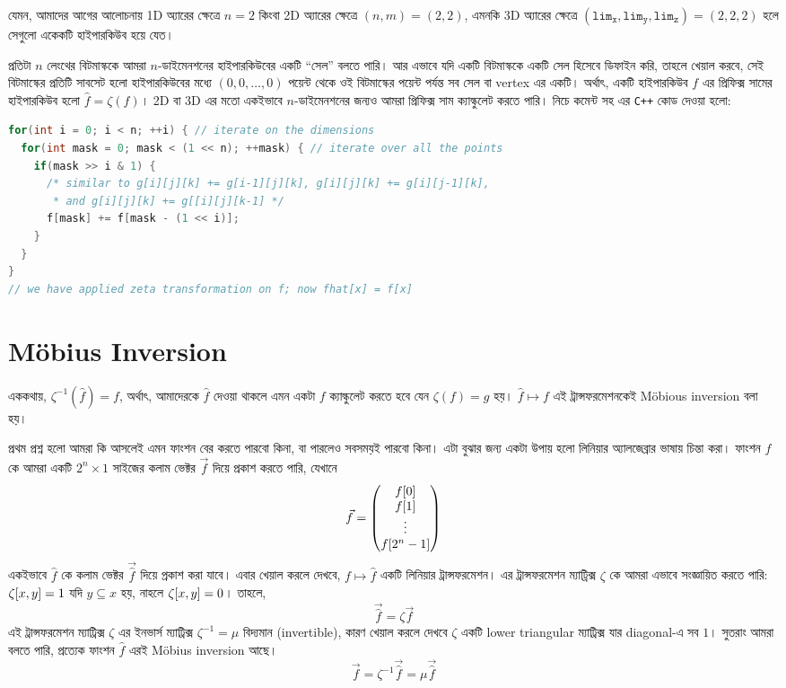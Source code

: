 যেমন, আমাদের আগের আলোচনায় 1D অ্যারের ক্ষেত্রে $n=2$ কিংবা 2D অ্যারের ক্ষেত্রে
$(n,m) = (2,2)$, এমনকি 3D অ্যারের ক্ষেত্রে $(\mathtt{lim_x}, \mathtt{lim_y},
\mathtt{lim_z}) = (2,2,2)$ হলে সেগুলো একেকটি হাইপারকিউব হয়ে যেত।

প্রতিটা $n$ লেংথের বিটমাস্ককে আমরা $n$-ডাইমেনশনের হাইপারকিউবের একটি ``সেল''
বলতে পারি। আর এভাবে যদি একটি বিটমাস্ককে একটি সেল হিসেবে ডিফাইন করি, তাহলে
খেয়াল করবে, সেই বিটমাস্কের প্রতিটি সাবসেট হলো হাইপারকিউবের মধ্যে $(0, 0,
\ldots, 0)$ পয়েন্ট থেকে ওই বিটমাস্কের পয়েন্ট পর্যন্ত সব সেল বা vertex এর
একটি। অর্থাৎ, একটি হাইপারকিউব $f$ এর প্রিফিক্স সামের হাইপারকিউব হলো $\hat{f}
= \zeta(f)$। 2D বা 3D এর মতো একইভাবে $n$-ডাইমেনশনের জন্যও আমরা প্রিফিক্স সাম
ক্যাল্কুলেট করতে পারি। নিচে কমেন্ট সহ এর \texttt{C++} কোড দেওয়া হলো:
\begin{lstlisting}[language=C++]
for(int i = 0; i < n; ++i) { // iterate on the dimensions
  for(int mask = 0; mask < (1 << n); ++mask) { // iterate over all the points
    if(mask >> i & 1) {
      /* similar to g[i][j][k] += g[i-1][j][k], g[i][j][k] += g[i][j-1][k],
       * and g[i][j][k] += g[[i][j][k-1] */
      f[mask] += f[mask - (1 << i)];
    }
  }
}
// we have applied zeta transformation on f; now fhat[x] = f[x]
\end{lstlisting}

\section{M{\"o}bius Inversion}
এককথায়, $\zeta^{-1}(\hat{f}) = f$, অর্থাৎ, আমাদেরকে $\hat{f}$ দেওয়া থাকলে এমন
একটা $f$ ক্যাল্কুলেট করতে হবে যেন $\zeta(f) = g$ হয়। $\hat{f} \mapsto f$ এই
ট্রান্সফরমেশনকেই M{\"o}bious inversion বলা হয়।

প্রথম প্রশ্ন হলো আমরা কি আসলেই এমন ফাংশন বের করতে পারবো কিনা, বা পারলেও
সবসময়ই পারবো কিনা। এটা বুঝার জন্য একটা উপায় হলো লিনিয়ার অ্যালজেব্রার ভাষায়
চিন্তা করা। ফাংশন $f$ কে আমরা একটি $2^n \times 1$ সাইজের কলাম ভেক্টর
$\vec{f}$ দিয়ে প্রকাশ করতে পারি, যেখানে
\[
  \vec{f} =
  \begin{pmatrix}
    f[0]\\
    f[1]\\
    \vdots\\
    f[2^n-1]
  \end{pmatrix}
\]
একইভাবে $\hat{f}$ কে কলাম ভেক্টর $\vec{\hat{f}}$ দিয়ে প্রকাশ করা যাবে।
এবার খেয়াল করলে দেখবে, $f \mapsto \hat{f}$ একটি লিনিয়ার ট্রান্সফরমেশন। এর
ট্রান্সফরমেশন ম্যাট্রিক্স $\zeta$ কে আমরা এভাবে সংজ্ঞায়িত করতে পারি:
$\zeta[x, y] = 1$ যদি $y \subseteq x$ হয়, নাহলে $\zeta[x, y] = 0$।
তাহলে,
\[
  \vec{\hat{f}} = \zeta \vec{f}
\]
এই ট্রান্সফরমেশন ম্যাট্রিক্স $\zeta$ এর ইনভার্স ম্যাট্রিক্স $\zeta^{-1} =
\mu$ বিদ্যমান
(invertible), কারণ খেয়াল করলে দেখবে $\zeta$ একটি lower triangular
ম্যাট্রিক্স যার diagonal-এ সব $1$। সুতরাং আমরা বলতে পারি, প্রত্যেক ফাংশন
$\hat{f}$ এরই M{\"o}bius inversion আছে।
\[
  \vec{f} = \zeta^{-1}\vec{\hat{f}} = \mu\vec{\hat{f}}
\]

